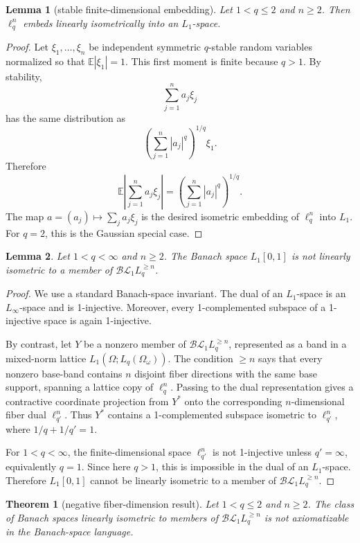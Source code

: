 \documentclass[11pt]{article}
\newcommand{\BL}{\mathcal{BL}}
\newtheorem{theorem}{Theorem}
\newtheorem{lemma}{Lemma}
\begin{document}
\begin{lemma}[stable finite-dimensional embedding]
Let \(1<q\le2\) and \(n\ge2\). Then \(\ell_q^n\) embeds linearly isometrically
into an \(L_1\)-space.
\end{lemma}

\begin{proof}
Let \(\xi_1,\ldots,\xi_n\) be independent symmetric \(q\)-stable random
variables normalized so that \(\mathbb E|\xi_1|=1\). This first moment is
finite because \(q>1\). By stability,
\[
\sum_{j=1}^n a_j\xi_j
\]
has the same distribution as
\[
\left(\sum_{j=1}^n |a_j|^q\right)^{1/q}\xi_1 .
\]
Therefore
\[
\mathbb E\left|\sum_{j=1}^n a_j\xi_j\right|
=
\left(\sum_{j=1}^n |a_j|^q\right)^{1/q}.
\]
The map \(a=(a_j)\mapsto \sum_j a_j\xi_j\) is the desired isometric embedding
of \(\ell_q^n\) into \(L_1\). For \(q=2\), this is the Gaussian special case.
\end{proof}

\begin{lemma}
Let \(1<q<\infty\) and \(n\ge2\). The Banach space \(L_1[0,1]\) is not
linearly isometric to a member of \(\BL_1L_q^{\ge n}\).
\end{lemma}

\begin{proof}
We use a standard Banach-space invariant. The dual of an \(L_1\)-space is an
\(L_\infty\)-space and is 1-injective. Moreover, every 1-complemented subspace
of a 1-injective space is again 1-injective.

By contrast, let \(Y\) be a nonzero member of \(\BL_1L_q^{\ge n}\), represented
as a band in a mixed-norm lattice \(L_1(\Omega;L_q(\Omega_\omega))\). The
condition \(\ge n\) says that every nonzero base-band contains \(n\) disjoint
fiber directions with the same base support, spanning a lattice copy of
\(\ell_q^n\). Passing to the dual representation gives a contractive
coordinate projection from \(Y^*\) onto the corresponding \(n\)-dimensional
fiber dual \(\ell_{q'}^n\). Thus \(Y^*\) contains a 1-complemented subspace
isometric to \(\ell_{q'}^n\), where \(1/q+1/q'=1\).

For \(1<q<\infty\), the finite-dimensional space \(\ell_{q'}^n\) is not
1-injective unless \(q'=\infty\), equivalently \(q=1\). Since here \(q>1\),
this is impossible in the dual of an \(L_1\)-space. Therefore
\(L_1[0,1]\) cannot be linearly isometric to a member of
\(\BL_1L_q^{\ge n}\).
\end{proof}

\begin{theorem}[negative fiber-dimension result]
Let \(1<q\le2\) and \(n\ge2\). The class of Banach spaces linearly isometric to
members of \(\BL_1L_q^{\ge n}\) is not axiomatizable in the Banach-space
language.
\end{theorem}
\end{document}

